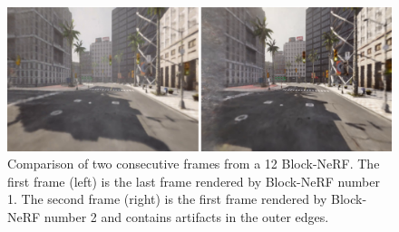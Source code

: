 \begin{figure}[!h]
    \centering
    \includegraphics[width=1.0\textwidth]{figures/block-nerf-frame-comparison.png}
    \caption[Comparison of consecutive frames in the overlap between Block-NeRFs.]{Comparison of two consecutive frames from a 12 Block-NeRF. The first frame (left) is the last frame rendered by Block-NeRF number 1. The second frame (right) is the first frame rendered by Block-NeRF number 2 and contains artifacts in the outer edges.}
    \label{fig:block-nerf-frame-comparison}
\end{figure}